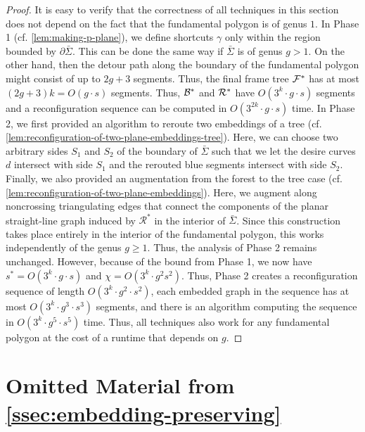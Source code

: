 \documentclass[a4paper,USenglish,cleveref,colorlinks=true,urlcolor=black,linkcolor=black,citecolor=black,thm-restate,authorcolumns]{lipics-v2021}
\theoremstyle{claimstyle}
\begin{document}
\begin{proof}
    \label{Pcorhighergenus}
    It is easy to verify that the correctness of all techniques in this section does not depend on the fact that the fundamental polygon is of genus $1$.
    In Phase 1 (cf. \cref{lem:making-p-plane}), we define shortcuts $\gamma$ only within the region bounded by $\partial\bar\Sigma$.
    This can be done the same way if $\bar\Sigma$ is of genus $g > 1$.
    On the other hand, then the detour path along the boundary of the fundamental polygon might consist of up to $2g+3$ segments.
    Thus, the final frame tree $\cal F^*$ has at most $(2g+3)k=O(g\cdot s)$ segments.
    Thus, $\cal B^*$ and $\cal R^*$ have $O(3^k\cdot g\cdot s)$ segments and a reconfiguration sequence can be computed in $O(3^{2k} \cdot g\cdot s)$ time.
    In Phase 2, we first provided an algorithm to reroute two embeddings of a tree (cf. \cref{lem:reconfiguration-of-two-plane-embeddings-tree}). Here, we can choose two arbitrary sides $S_1$ and $S_2$ of the boundary of $\bar \Sigma$ such that we let the desire curves $d$ intersect with side $S_1$ and the rerouted blue segments intersect with side $S_2$.
    Finally, we also provided an augmentation from the forest to the tree case (cf. \cref{lem:reconfiguration-of-two-plane-embeddings}).
    Here, we augment along noncrossing triangulating edges that connect the components of the planar straight-line graph induced by $\mathcal R^*$ in the interior of $\bar\Sigma$.
    Since this construction takes place entirely in the interior of the fundamental polygon, this works independently of the genus $g \geq 1$.
    Thus, the analysis of Phase 2 remains unchanged.
    However, because of the bound from Phase 1, we now have $s^* = O(3^k\cdot g\cdot s)$ and $\chi = O(3^k\cdot g^2s^2)$.
    Thus, Phase 2 creates a reconfiguration sequence of length $O(3^k\cdot g^2\cdot s^2)$, each embedded graph in the sequence has at most $O(3^k \cdot g^3\cdot s^3)$ segments, and there is an algorithm computing the sequence in $O(3^k\cdot g^5\cdot s^5)$ time.
    Thus, all techniques also work for any fundamental polygon at the cost of a runtime that depends on $g$.
\end{proof}






\section{Omitted Material from \cref{ssec:embedding-preserving}}
\label{app:embedding-preserving}
\end{document}
